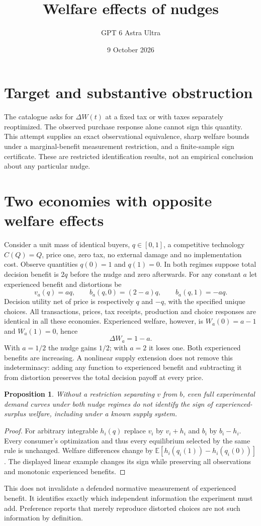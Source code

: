 \documentclass[11pt]{article}
\title{Welfare effects of nudges}
\author{GPT 6 Astra Ultra}
\date{9 October 2026}
\newtheorem{proposition}[theorem]{Proposition}
\theoremstyle{definition}
\newcommand{\E}{\mathbb E}
\begin{document}
\maketitle
\section*{Target and substantive obstruction}
The catalogue asks for $\Delta W(t)$ at a fixed tax or with taxes separately
reoptimized. The observed purchase response alone cannot sign this quantity.
This attempt supplies an exact observational equivalence, sharp welfare bounds
under a marginal-benefit measurement restriction, and a finite-sample sign
certificate. These are restricted identification results, not an empirical
conclusion about any particular nudge.

\section*{Two economies with opposite welfare effects}
Consider a unit mass of identical buyers, $q\in[0,1]$, a competitive technology
$C(Q)=Q$, price one, zero tax, no external damage and no implementation cost.
Observe quantities $q(0)=1$ and $q(1)=0$. In both regimes suppose total decision
benefit is $2q$ before the nudge and zero afterwards. For any constant $a$ let
experienced benefit and distortions be
\[
 v_a(q)=a q,\qquad b_a(q,0)=(2-a)q,\qquad b_a(q,1)=-a q.
\]
Decision utility net of price is respectively $q$ and $-q$, with the specified
unique choices. All transactions, prices, tax receipts, production and choice
responses are identical in all these economies. Experienced welfare, however,
is $W_a(0)=a-1$ and $W_a(1)=0$, hence
\[
 \Delta W_a=1-a.
\]
With $a=1/2$ the nudge gains $1/2$; with $a=2$ it loses one. Both experienced
benefits are increasing. A nonlinear supply extension does not remove this
indeterminacy: adding any function to experienced benefit and subtracting it
from distortion preserves the total decision payoff at every price.

\begin{proposition}
Without a restriction separating $v$ from $b$, even full experimental demand
curves under both nudge regimes do not identify the sign of experienced-surplus
welfare, including under a known supply system.
\end{proposition}
\begin{proof}
For arbitrary integrable $h_i(q)$ replace $v_i$ by $v_i+h_i$ and $b_i$ by
$b_i-h_i$. Every consumer's optimization and thus every equilibrium selected
by the same rule is unchanged. Welfare differences change by
$\E[h_i(q_i(1))-h_i(q_i(0))]$. The displayed linear example changes its sign
while preserving all observations and monotonic experienced benefits.
\end{proof}
This does not invalidate a defended normative measurement of experienced
benefit. It identifies exactly which independent information the experiment
must add. Preference reports that merely reproduce distorted choices are not
such information by definition.
\end{document}
